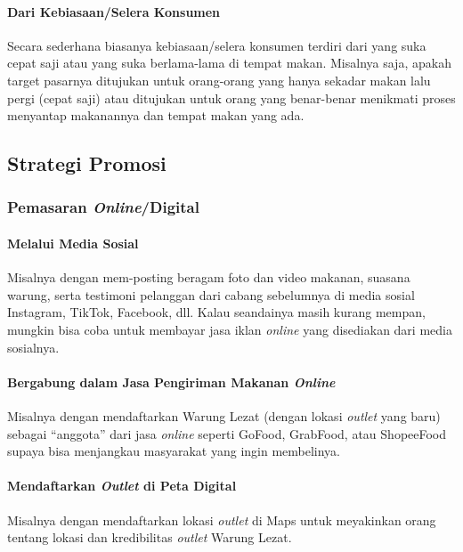 \paragraph{Dari Kebiasaan/Selera Konsumen}

Secara sederhana biasanya kebiasaan/selera konsumen terdiri dari yang suka cepat saji atau yang suka berlama-lama di tempat makan. Misalnya saja, apakah target pasarnya ditujukan untuk orang-orang yang hanya sekadar makan lalu pergi (cepat saji) atau ditujukan untuk orang yang benar-benar menikmati proses menyantap makanannya dan tempat makan yang ada.

\subsection{Strategi Promosi}

\subsubsection{Pemasaran \textit{Online}/Digital}

\paragraph{Melalui Media Sosial}

Misalnya dengan mem-posting beragam foto dan video makanan, suasana warung, serta testimoni pelanggan dari cabang sebelumnya di media sosial Instagram, TikTok, Facebook, dll. Kalau seandainya masih kurang mempan, mungkin bisa coba untuk membayar jasa iklan \textit{online} yang disediakan dari media sosialnya.

\paragraph{Bergabung dalam Jasa Pengiriman Makanan \textit{Online}}

Misalnya dengan mendaftarkan Warung Lezat (dengan lokasi \textit{outlet} yang baru) sebagai “anggota” dari jasa \textit{online} seperti GoFood, GrabFood, atau ShopeeFood supaya bisa menjangkau masyarakat yang ingin membelinya.

\paragraph{Mendaftarkan \textit{Outlet} di Peta Digital}

Misalnya dengan mendaftarkan lokasi \textit{outlet} di Maps untuk meyakinkan orang tentang lokasi dan kredibilitas \textit{outlet} Warung Lezat.

